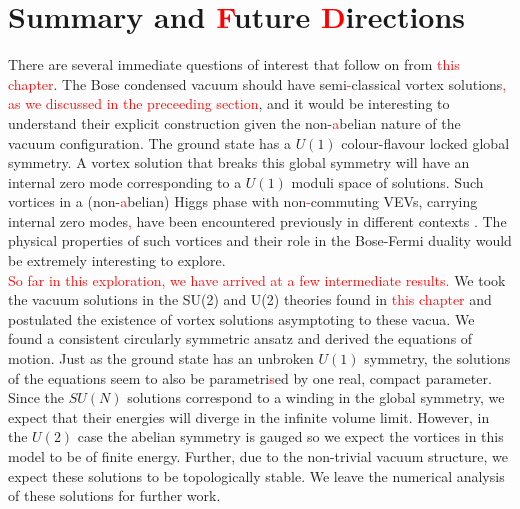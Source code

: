 \section{Summary and \textcolor{red}{F}uture \textcolor{red}{D}irections}
\label{sec5}
There are several immediate questions of interest that follow on from \textcolor{red}{this chapter}.
The Bose condensed vacuum should have semi\textcolor{red}{-}classical vortex solutions\textcolor{red}{, as we discussed in the preceeding section}, and it would be interesting to understand their explicit construction given the non-\textcolor{red}{a}belian nature of the vacuum configuration. The ground state has a $U(1)$ colour-flavour locked global symmetry. A vortex solution that breaks this global symmetry will have an internal zero mode corresponding to a $U(1)$ moduli space of solutions.  Such vortices in a (non-\textcolor{red}{a}belian) Higgs phase with non\textcolor{red}{-}commuting VEVs, carrying internal zero modes\textcolor{red}{,} have been encountered previously in different contexts \cite{Markov:2004mj, Auzzi:2008ep, Auzzi:2009es}. The physical properties of such vortices and their role in the Bose-Fermi duality would be extremely interesting to explore.\\
    \indent \textcolor{red}{So far in this exploration, we have arrived at a few intermediate results.} We took the vacuum solutions in the SU(2) and U(2) theories found in \textcolor{red}{this chapter} and postulated the existence of vortex solutions asymptoting to these vacua. We found a consistent circularly symmetric ansatz and derived the equations of motion. Just as the ground state has an unbroken $U(1)$ symmetry, the solutions of the equations seem to also be parametri\textcolor{red}{s}ed by one real, compact parameter. Since the $SU(N)$ solutions correspond to a winding in the global symmetry, we expect that their energies will diverge in the infinite volume limit. However, in the $U(2)$ case the abelian symmetry is gauged so we expect the vortices in this model to be of finite energy. Further, due to the non-trivial vacuum structure, we expect these solutions to be topologically stable. We leave the numerical analysis of these solutions for further work.


